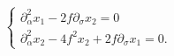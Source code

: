 \begin{equation}
\left \{
\begin{array}{l}
\partial^2_\alpha  x_1 - 2 f  \partial_\sigma x_2 = 0 \\
\partial^2_\alpha  x_2 - 4 f^2 x_2 + 2 f  \partial_\sigma x_1 = 0. 
\end{array}
\right.
\end{equation}

